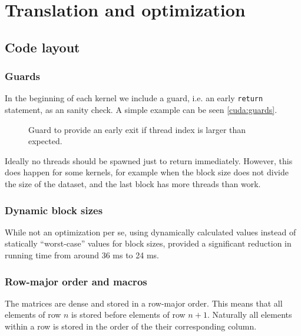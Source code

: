
\section{Translation and optimization}

\subsection{Code layout}

\subsubsection{Guards} In the beginning of each kernel we include a guard, i.e.
an early \texttt{return} statement, as an sanity check. A simple example can be
seen \autoref{cuda:guards}.

\begin{figure}[H]
    \centering
    \caption{Guard to provide an early exit if thread index is larger than expected.}
    \label{cuda:guards}
\end{figure}

Ideally no threads should be spawned just to return immediately. However, this
does happen for some kernels, for example when the block size does not divide
the size of the dataset, and the last block has more threads than work.

\subsubsection{Dynamic block sizes}
While not an optimization per se, using dynamically calculated values
instead of statically \enquote{worst-case} values for block sizes, provided
a significant reduction in running time from around 36 ms to 24 ms. 



\subsubsection{Row-major order and macros}

The matrices are dense and stored in a row-major order. This means that all
elements of row \(n\) is stored before elements of row \(n+1\). Naturally all
elements within a row is stored in the order of the their corresponding column.



